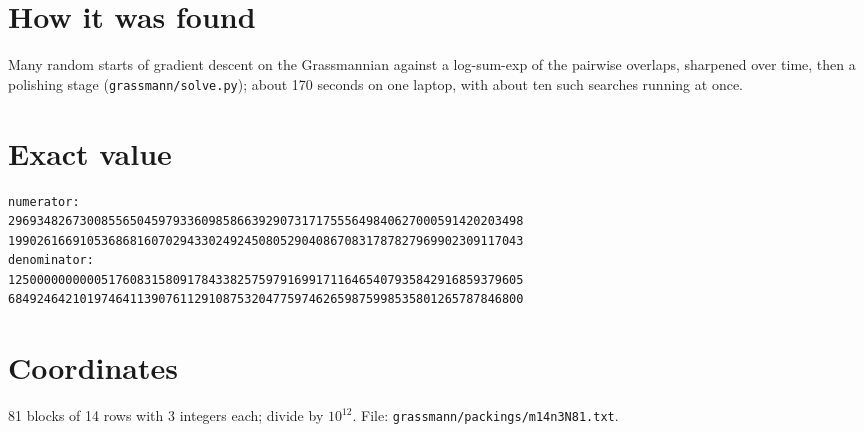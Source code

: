 \documentclass[11pt,a4paper]{article}
\begin{document}
\section{How it was found}
Many random starts of gradient descent on the Grassmannian against a log-sum-exp of the pairwise overlaps, sharpened over time, then a polishing stage (\texttt{grassmann/solve.py}); about 170 seconds on one laptop, with about ten such searches running at once.


\appendix
\section{Exact value}
{\small
\begin{verbatim}
numerator:
296934826730085565045979336098586639290731717555649840627000591420203498
199026166910536868160702943302492450805290408670831787827969902309117043
denominator:
125000000000051760831580917843382575979169917116465407935842916859379605
684924642101974641139076112910875320477597462659875998535801265787846800
\end{verbatim}}

\section{Coordinates}
81 blocks of 14 rows with 3 integers each; divide by $10^{12}$. File: \texttt{grassmann/packings/m14n3N81.txt}.
{\tiny
\begin{multicols}{3}
\end{multicols}}
\end{document}
